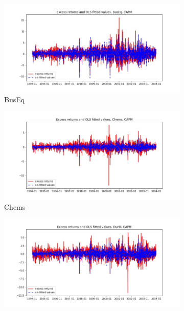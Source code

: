 \documentclass{article}
\begin{document}
\begin{figure}
  \begin{subfigure}[b]{0.5\textwidth}
    \centering
    \includegraphics[width=\textwidth]{BusEq/fitted_CAPM.jpg}
    \caption{BusEq}
    \label{fig:1}
  \end{subfigure}
  \begin{subfigure}[b]{0.5\textwidth}
    \centering
    \includegraphics[width=\textwidth]{Chems/fitted_CAPM.jpg}
    \caption{Chems}
    \label{fig:2}
  \end{subfigure}
  \begin{subfigure}[b]{0.5\textwidth}
    \centering
    \includegraphics[width=\textwidth]{Durbl/fitted_CAPM.jpg}

\end{subfigure}
\end{figure}
\end{document}

